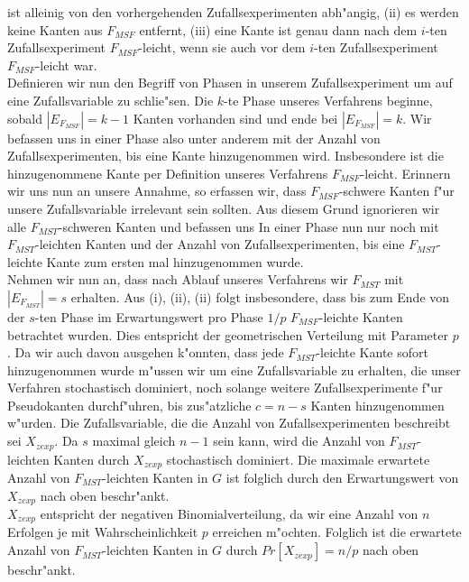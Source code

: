     ist alleinig von den vorhergehenden Zufallsexperimenten abh"angig,
    (ii) es werden keine Kanten aus $F_{MSF}$ entfernt,
    (iii) eine Kante ist genau dann nach dem $i$-ten Zufallsexperiment 
    $F_{MSF}$-leicht, wenn sie auch vor dem $i$-ten Zufallsexperiment $F_{MSF}$-leicht
    war.\\
Definieren wir nun den Begriff von Phasen in unserem Zufallsexperiment um auf
    eine Zufallsvariable zu schlie"sen.
    Die $k$-te Phase unseres Verfahrens beginne, sobald $|E_{F_{MSF}}| = k-1$ Kanten
    vorhanden sind und ende bei $|E_{F_{MSF}}| = k$.
    Wir befassen uns in einer Phase also unter anderem mit der Anzahl von 
    Zufallsexperimenten, bis eine Kante hinzugenommen wird.
    Insbesondere ist die hinzugenommene Kante per Definition unseres Verfahrens
    $F_{MSF}$-leicht. Erinnern wir uns nun an unsere Annahme, so erfassen wir,
    dass $F_{MSF}$-schwere Kanten f"ur unsere Zufallsvariable irrelevant sein
    sollten. Aus diesem Grund ignorieren wir alle $F_{MST}$-schweren Kanten und
    befassen uns In einer Phase nun nur noch mit $F_{MST}$-leichten Kanten und
    der Anzahl von Zufallsexperimenten, bis eine $F_{MST}$-leichte Kante zum 
    ersten mal hinzugenommen wurde.\\
Nehmen wir nun an, dass nach Ablauf unseres Verfahrens wir $F_{MST}$ mit
    $|E_{F_{MST}}| = s$ erhalten. Aus (i), (ii), (ii) folgt insbesondere, dass bis zum Ende
    von der $s$-ten Phase im Erwartungswert pro Phase $1/p$ $F_{MSF}$-leichte
    Kanten betrachtet wurden. Dies entspricht der geometrischen Verteilung mit
    Parameter $p$. Da wir auch davon ausgehen k"onnten, dass jede $F_{MST}$-leichte
    Kante sofort hinzugenommen wurde m"ussen wir um eine Zufallsvariable zu 
    erhalten, die unser Verfahren stochastisch dominiert, noch solange weitere 
    Zufallsexperimente f"ur Pseudokanten durchf"uhren, bis zus"atzliche 
    $c=n-s$ Kanten hinzugenommen w"urden.
    Die Zufallsvariable, die die Anzahl von Zufallsexperimenten beschreibt sei
    $X_{zexp}$.
    Da $s$ maximal gleich $n-1$ sein kann, wird die Anzahl von $F_{MST}$-leichten
    Kanten durch $X_{zexp}$ stochastisch dominiert.
    Die maximale erwartete Anzahl von $F_{MST}$-leichten Kanten in $G$ ist folglich durch den
    Erwartungswert von $X_{zexp}$ nach oben beschr"ankt.\\
$X_{zexp}$ entspricht der negativen Binomialverteilung, da wir eine Anzahl von
    $n$ Erfolgen je mit Wahrscheinlichkeit $p$ erreichen m"ochten. 
    Folglich ist die erwartete Anzahl von $F_{MST}$-leichten Kanten in $G$ durch 
    $Pr[X_{zexp}] = n/p$ nach oben beschr"ankt.\\
